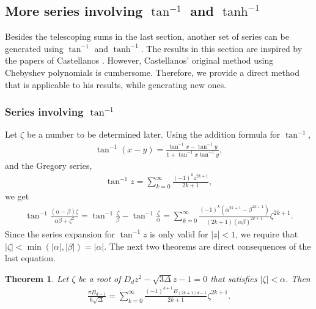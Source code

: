 \documentclass[12pt]{article}
\theoremstyle{plain}
\newtheorem{theorem}{Theorem}
\theoremstyle{definition}
\theoremstyle{remark}
\begin{document}
\subsection{More series involving \texorpdfstring{$ \tan^{-1} $}{arctan} and \texorpdfstring{$ \tanh^{-1} $}{artanh}} \label{Sec:More_Series_Involving_arctan_and_artanh}

Besides the telescoping sums in the last section, another set of series can be generated using $ \tan^{-1} $ and $ \tanh^{-1} $. The results in this section are inspired by the papers of Castellanos \cite{Castellanos_86, Castellanos_89}. However, Castellanos' original method using Chebyshev polynomials is cumbersome. Therefore, we provide a direct method that is applicable to his results, while generating new ones.

\subsubsection{Series involving \texorpdfstring{$ \tan^{-1} $}{arctan}} \label{Sec:Series_Involving_arctan}

 Let $ \zeta $ be a number to be determined later. Using the addition formula for $ \tan^{-1} $,
\begin{align*}
	\tan^{-1} (x - y) = \frac{\tan^{-1} x - \tan^{-1} y}{1 + \tan^{-1} x \tan^{-1} y},
\end{align*}
and the Gregory series,
\begin{align*}
	\tan^{-1} z = \sum_{k = 0}^\infty \frac{(-1)^k z^{2k + 1}}{2k + 1},
\end{align*}
we get
\begin{align*}
	\tan^{-1} \frac{(\alpha - \beta) \zeta}{\alpha \beta + \zeta^2} = \tan^{-1} \frac{\zeta}{\beta} - \tan^{-1} \frac{\zeta}{\alpha} = \sum_{k = 0}^\infty \frac{(-1)^k (\alpha^{2k + 1} - \beta^{2k + 1})}{(2k + 1) (\alpha \beta)^{2k + 1}} \zeta^{2k + 1}.
\end{align*}
Since the series expansion for $ \tan^{-1} z $ is only valid for $ |z| < 1 $, we require that $ |\zeta| < \min (|\alpha|, |\beta|) = |\alpha| $. The next two theorems are direct consequences of the last equation.
\begin{theorem} Let $ \zeta $ be a root of $ D_d z^2 - \sqrt{3\Delta} z - 1 = 0 $ that satisfies $ |\zeta| < \alpha $. Then
\begin{align*}
	\frac{\pi B_{d - 1}}{6 \sqrt{\Delta}} = \sum_{k = 0}^\infty \frac{(-1)^{k + 1} B_{(2k + 1)d - 1}}{2k + 1} \zeta^{2k + 1}.
\end{align*}
\end{theorem}
\end{document}
